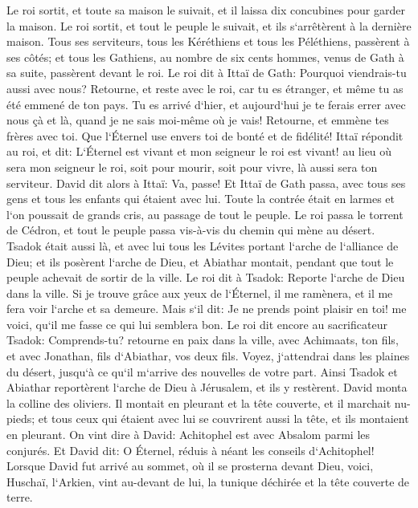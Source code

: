 \verse Le roi sortit, et toute sa maison le suivait, et il laissa dix concubines pour garder la maison. 
\verse Le roi sortit, et tout le peuple le suivait, et ils s`arrêtèrent à la dernière maison. 
\verse Tous ses serviteurs, tous les Kéréthiens et tous les Péléthiens, passèrent à ses côtés; et tous les Gathiens, au nombre de six cents hommes, venus de Gath à sa suite, passèrent devant le roi. 
\verse Le roi dit à Ittaï de Gath: Pourquoi viendrais-tu aussi avec nous? Retourne, et reste avec le roi, car tu es étranger, et même tu as été emmené de ton pays. 
\verse Tu es arrivé d`hier, et aujourd`hui je te ferais errer avec nous çà et là, quand je ne sais moi-même où je vais! Retourne, et emmène tes frères avec toi. Que l`Éternel use envers toi de bonté et de fidélité! 
\verse Ittaï répondit au roi, et dit: L`Éternel est vivant et mon seigneur le roi est vivant! au lieu où sera mon seigneur le roi, soit pour mourir, soit pour vivre, là aussi sera ton serviteur. 
\verse David dit alors à Ittaï: Va, passe! Et Ittaï de Gath passa, avec tous ses gens et tous les enfants qui étaient avec lui. 
\verse Toute la contrée était en larmes et l`on poussait de grands cris, au passage de tout le peuple. Le roi passa le torrent de Cédron, et tout le peuple passa vis-à-vis du chemin qui mène au désert. 
\verse Tsadok était aussi là, et avec lui tous les Lévites portant l`arche de l`alliance de Dieu; et ils posèrent l`arche de Dieu, et Abiathar montait, pendant que tout le peuple achevait de sortir de la ville. 
\verse Le roi dit à Tsadok: Reporte l`arche de Dieu dans la ville. Si je trouve grâce aux yeux de l`Éternel, il me ramènera, et il me fera voir l`arche et sa demeure. 
\verse Mais s`il dit: Je ne prends point plaisir en toi! me voici, qu`il me fasse ce qui lui semblera bon. 
\verse Le roi dit encore au sacrificateur Tsadok: Comprends-tu? retourne en paix dans la ville, avec Achimaats, ton fils, et avec Jonathan, fils d`Abiathar, vos deux fils. 
\verse Voyez, j`attendrai dans les plaines du désert, jusqu`à ce qu`il m`arrive des nouvelles de votre part. 
\verse Ainsi Tsadok et Abiathar reportèrent l`arche de Dieu à Jérusalem, et ils y restèrent. 
\verse David monta la colline des oliviers. Il montait en pleurant et la tête couverte, et il marchait nu-pieds; et tous ceux qui étaient avec lui se couvrirent aussi la tête, et ils montaient en pleurant. 
\verse On vint dire à David: Achitophel est avec Absalom parmi les conjurés. Et David dit: O Éternel, réduis à néant les conseils d`Achitophel! 
\verse Lorsque David fut arrivé au sommet, où il se prosterna devant Dieu, voici, Huschaï, l`Arkien, vint au-devant de lui, la tunique déchirée et la tête couverte de terre. 
